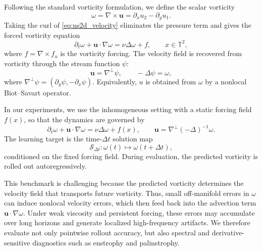 \documentclass[11pt]{article}
\begin{document}
Following the standard vorticity formulation, we define the scalar vorticity
\begin{equation}
    \omega = \nabla\times\mathbf{u}
    =\partial_x u_2 - \partial_y u_1 .
\end{equation}
Taking the curl of \eqref{eq:ns2d_velocity} eliminates the pressure term and gives the forced vorticity equation
\begin{equation}
    \partial_t \omega + \mathbf{u}\cdot\nabla \omega
    =
    \nu \Delta \omega + f,
    \qquad x\in\mathbb{T}^2,
    \label{eq:ns2d_vorticity}
\end{equation}
where $f=\nabla\times f_u$ is the vorticity forcing. The velocity field is recovered from vorticity through the stream function $\psi$:
\begin{equation}
    \mathbf{u} = \nabla^\perp \psi,
    \qquad
    -\Delta \psi = \omega,
    \label{eq:ns2d_biot_savart}
\end{equation}
where $\nabla^\perp \psi = (\partial_y\psi,-\partial_x\psi)$. Equivalently,
$u$ is obtained from $\omega$ by a nonlocal Biot--Savart operator.

In our experiments, we use the inhomogeneous setting with a static forcing field $f(x)$, so that the dynamics are governed by
\begin{equation}
    \partial_t \omega + \mathbf{u}\cdot\nabla \omega
    =
    \nu \Delta \omega + f(x),
    \qquad
    \mathbf{u} = \nabla^\perp(-\Delta)^{-1}\omega .
    \label{eq:ns2d_forced}
\end{equation}
The learning target is the time-$\Delta t$ solution map
\begin{equation}
    \mathcal{S}_{\Delta t}:
    \omega(t) \mapsto \omega(t+\Delta t),
    \label{eq:ns2d_solution_map}
\end{equation}
conditioned on the fixed forcing field. During evaluation, the predicted vorticity is rolled out autoregressively.

This benchmark is challenging because the predicted vorticity determines the velocity field that transports future vorticity. Thus, small off-manifold errors in $\omega$ can induce nonlocal velocity errors, which then feed back into the advection term $\mathbf{u}\cdot\nabla\omega$. Under weak viscosity and persistent forcing, these errors may accumulate over long horizons and generate localized high-frequency artifacts. We therefore evaluate not only pointwise rollout accuracy, but also spectral and derivative-sensitive diagnostics such as enstrophy and palinstrophy.
\end{document}
